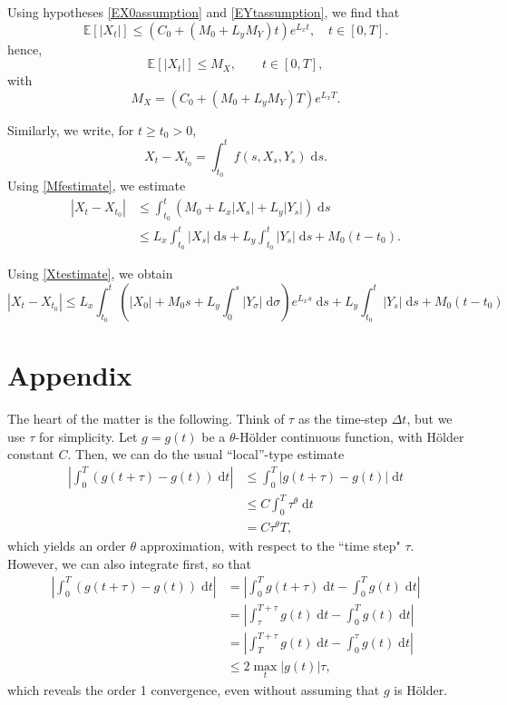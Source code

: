 \documentclass[reqno,12pt]{amsart}
\theoremstyle{plain}%
\theoremstyle{definition}
\begin{document}
Using hypotheses \eqref{EX0assumption} and \eqref{EYtassumption}, we find that
$$
\mathbb{E}[|X_t|] \leq \left( C_0 + (M_0 + L_y M_Y) t \right) e^{L_x t}, \quad t \in [0, T].
$$
hence,
\begin{equation}
    \label{EXtestimate}
    \mathbb{E}[|X_t|] \leq M_X, \qquad t \in [0, T],
\end{equation}
with
\begin{equation}
    \label{MXt}
    M_X = (C_0 + (M_0 + L_y M_Y)T)e^{L_x T}.
\end{equation}


Similarly, we write, for $t \geq t_0 > 0$,
$$
X_t - X_{t_0} = \int_{t_0}^t f(s, X_s, Y_s) \;\mathrm{d}s.
$$
Using \eqref{Mfestimate}, we estimate
\begin{align*}
    |X_t - X_{t_0}| & \leq \int_{t_0}^t \left(M_0 + L_x |X_s| + L_y|Y_s| \right)\;\mathrm{d}s \\
    & \leq L_x \int_{t_0}^t |X_s| \;\mathrm{d}s + L_y\int_{t_0}^t |Y_s|\;\mathrm{d}s + M_0(t - t_0).
\end{align*}

Using \eqref{Xtestimate}, we obtain
\begin{equation}
    |X_t - X_{t_0}| \leq L_x \int_{t_0}^t \left( |X_0| + M_0 s  + L_y \int_0^s |Y_\sigma| \;\mathrm{d}\sigma\right) e^{L_x s} \;\mathrm{d}s + L_y\int_{t_0}^t |Y_s|\;\mathrm{d}s + M_0(t - t_0)
\end{equation}

\section*{Appendix}

The heart of the matter is the following. Think of $\tau$ as the time-step $\Delta t$, but we use $\tau$ for simplicity. Let $g=g(t)$ be a $\theta$-H\"older continuous function, with H\"older constant $C$. Then, we can do the usual ``local''-type estimate
\begin{align*}
    \left|\int_0^T \left(g(t + \tau) - g(t) \right) \;\mathrm{d}t \right| & \leq \int_0^T \left|g(t + \tau) - g(t) \right| \;\mathrm{d}t \\
    & \leq C\int_0^T \tau^{\theta} \;\mathrm{d}t \\
    & = C\tau^{\theta}T,
\end{align*}
which yields an order $\theta$ approximation, with respect to the ``time step" $\tau$. However, we can also integrate first, so that
\begin{align*}
    \left|\int_0^T \left(g(t + \tau) - g(t) \right) \;\mathrm{d}t \right| & = \left|\int_0^T g(t + \tau) \;\mathrm{d}t - \int_0^T g(t) \;\mathrm{d}t \right| \\ 
    & = \left| \int_\tau^{T+\tau} g(t) \;\mathrm{d}t - \int_0^T g(t) \;\mathrm{d}t \right| \\
    & = \left| \int_T^{T+\tau} g(t) \;\mathrm{d}t - \int_0^\tau g(t) \;\mathrm{d}t \right| \\
    & \leq 2\max_t|g(t)| \tau,
\end{align*}
which reveals the order 1 convergence, even without assuming that $g$ is H\"older.
\end{document}
